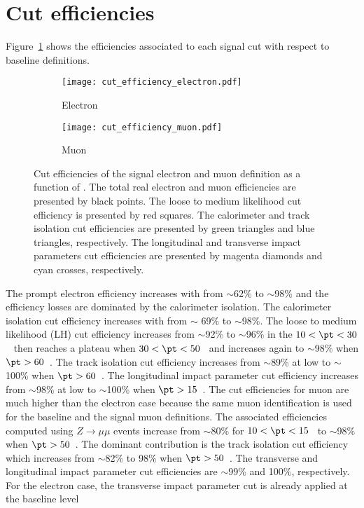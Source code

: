 \section{Cut efficiencies}
\label{sec:app_RLE_cut_efficiencies}
Figure~\ref{fig:app_RLE_cut_efficiencies} shows the efficiencies associated to each signal cut with respect to baseline definitions.
%
\begin{figure}[htbp]
    \begin{subfigure}[b]{0.48\textwidth}
        \begin{center}
            \texttt{[image: cut\_efficiency\_electron.pdf]}
            \caption{Electron}
        \end{center}
    \end{subfigure}
    \begin{subfigure}[b]{0.48\textwidth}
        \begin{center}
            \texttt{[image: cut\_efficiency\_muon.pdf]}
            \caption{Muon}
        \end{center}
    \end{subfigure}
    \caption{Cut efficiencies of the signal electron and muon definition as a function of \pt.
    The total real electron and muon efficiencies are presented by black points. 
    The loose to medium likelihood cut efficiency is presented by red squares.
    The calorimeter and track isolation cut efficiencies are presented by green triangles and blue triangles, respectively.
    The longitudinal and transverse impact parameters cut efficiencies are presented by magenta diamonds and cyan crosses, respectively.}
    \label{fig:app_RLE_cut_efficiencies}
\end{figure}
%
The prompt electron efficiency increases with \pt from $\sim$62\% to $\sim$98\% and the efficiency losses are dominated by the calorimeter isolation.
The calorimeter isolation cut efficiency increases with \pt from $\sim$ 69\% to $\sim$98\%.
The loose to medium likelihood (LH) cut efficiency increases from $\sim$92\% to $\sim$96\% in the $10< \pt < 30$~{\GeV} then reaches a plateau when $30 < \pt < 50$~{\GeV} and increases again to $\sim$98\% when $\pt > 60$~{\GeV}.
The track isolation cut efficiency increases from $\sim$89\% at low \pt to $\sim$100\% when $\pt > 60$~{\GeV}.
The longitudinal impact parameter cut efficiency increases from $\sim$98\% at low \pt to $\sim$100\% when $\pt > 15$~{\GeV}.
The cut efficiencies for muon are much higher than the electron case because the same muon identification is used for the baseline and the signal muon definitions.
The associated efficiencies computed using $Z\to \mu \mu$ events increase from $\sim$80\% for $10 < \pt < 15$~{\GeV} to $\sim$98\% when $\pt > 50$~{\GeV}.
The dominant contribution is the track isolation cut efficiency which increases from $\sim$82\% to 98\% when $\pt > 50$~{\GeV}.
The transverse and longitudinal impact parameter cut efficiencies are $\sim$99\% and 100\%, respectively.
For the electron case, the transverse impact parameter cut is already applied at the baseline level

